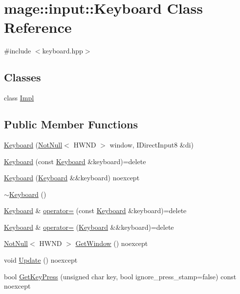 \hypertarget{classmage_1_1input_1_1_keyboard}{}\section{mage\+:\+:input\+:\+:Keyboard Class Reference}
\label{classmage_1_1input_1_1_keyboard}


{\ttfamily \#include $<$keyboard.\+hpp$>$}

\subsection*{Classes}
\begin{DoxyCompactItemize}
\item 
class \hyperlink{classmage_1_1input_1_1_keyboard_1_1_impl}{Impl}
\end{DoxyCompactItemize}
\subsection*{Public Member Functions}
\begin{DoxyCompactItemize}
\item 
\hyperlink{classmage_1_1input_1_1_keyboard_af9ac64b485a4fdca497d007283faca18}{Keyboard} (\hyperlink{namespacemage_a8769f9d670d6b585ea306cb1062af94b}{Not\+Null}$<$ H\+W\+ND $>$ window, I\+Direct\+Input8 \&di)
\item 
\hyperlink{classmage_1_1input_1_1_keyboard_ae7297c3080b0e6f78e37cf94ce3effcb}{Keyboard} (const \hyperlink{classmage_1_1input_1_1_keyboard}{Keyboard} \&keyboard)=delete
\item 
\hyperlink{classmage_1_1input_1_1_keyboard_adb93a42b959d58fc320215157f85854c}{Keyboard} (\hyperlink{classmage_1_1input_1_1_keyboard}{Keyboard} \&\&keyboard) noexcept
\item 
\hyperlink{classmage_1_1input_1_1_keyboard_a71239cd5326f78ab226f145a430b382b}{$\sim$\+Keyboard} ()
\item 
\hyperlink{classmage_1_1input_1_1_keyboard}{Keyboard} \& \hyperlink{classmage_1_1input_1_1_keyboard_a8a06eeb906625f100928f3fe2d17cf9d}{operator=} (const \hyperlink{classmage_1_1input_1_1_keyboard}{Keyboard} \&keyboard)=delete
\item 
\hyperlink{classmage_1_1input_1_1_keyboard}{Keyboard} \& \hyperlink{classmage_1_1input_1_1_keyboard_a7dc2316d53a043fa42e4909bd8e58bb9}{operator=} (\hyperlink{classmage_1_1input_1_1_keyboard}{Keyboard} \&\&keyboard)=delete
\item 
\hyperlink{namespacemage_a8769f9d670d6b585ea306cb1062af94b}{Not\+Null}$<$ H\+W\+ND $>$ \hyperlink{classmage_1_1input_1_1_keyboard_a9838f6a7453f74d545926bf5de4c7750}{Get\+Window} () noexcept
\item 
void \hyperlink{classmage_1_1input_1_1_keyboard_a14e53eed6b75a2c45ca3caf94d797bc0}{Update} () noexcept
\item 
bool \hyperlink{classmage_1_1input_1_1_keyboard_a287feaae6c0bf0a93b97f29a601b177a}{Get\+Key\+Press} (unsigned char key, bool ignore\+\_\+press\+\_\+stamp=false) const noexcept
\end{DoxyCompactItemize}
